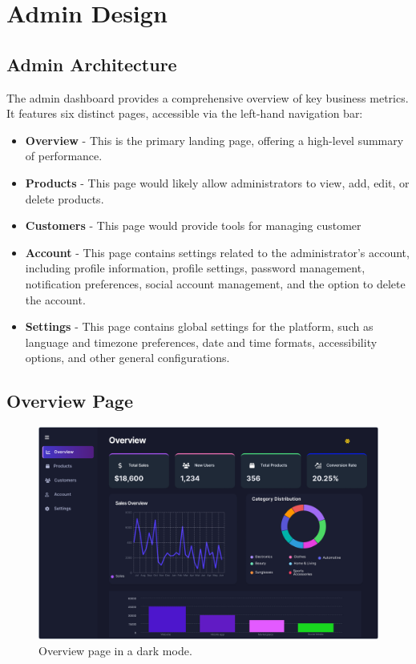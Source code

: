 \documentclass[12pt]{article}
\begin{document}
	
	\section{Admin Design}\label{sec:admin-design}
	\vspace{0.3cm}
	
	
	\subsection{Admin Architecture}\label{subsec:admin-architecture}
	The admin dashboard provides a comprehensive overview of key business metrics. It features six distinct pages, accessible via the left-hand navigation bar:
	\begin{itemize}
		\item \textbf{Overview} - This is the primary landing page, offering a high-level summary of performance.
		\item \textbf{Products} - This page would likely allow administrators to view, add, edit, or delete products.
		\item \textbf{Customers} - This page would provide tools for managing customer
		\item \textbf{Account} - This page contains settings related to the administrator's account, including profile information, profile settings, password management, notification preferences, social account management, and the option to delete the account.
		\item \textbf{Settings} - This page contains global settings for the platform, such as language and timezone preferences, date and time formats, accessibility options, and other general configurations.
	\end{itemize}
	\newpage
	\subsection{Overview Page}\label{subsec:overview-page}

	\begin{figure}[h]
		\centering
		\includegraphics[width=1\textwidth]{pictures/admin/Overview_Admin}
		\caption{Overview page in a dark mode.}\label{fig:figure1}
	\end{figure}
\end{document}

